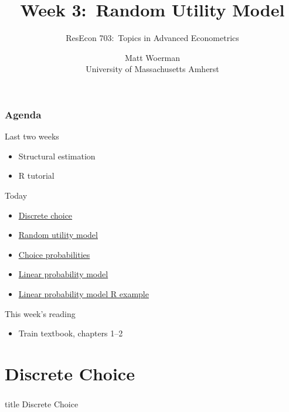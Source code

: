 \documentclass{beamer}\usepackage[]{graphicx}\usepackage[]{color}
\title[Week 3:\ Random Utility Model]{Week 3:\ Random Utility Model}
\author[ResEcon 703:\ Advanced Econometrics]{ResEcon 703:\ Topics in Advanced Econometrics}
\date{Matt Woerman\\University of Massachusetts Amherst}
\begin{document}
{ 
\begin{frame}[noframenumbering]
    \titlepage
\end{frame}
}

\begin{frame}\frametitle{Agenda}
    Last two weeks
    \begin{itemize}
    	\item Structural estimation
        \item R tutorial
    \end{itemize}
    \vspace{2ex}
    Today
    \begin{itemize}
    	\item \hyperlink{page.\getpagerefnumber{dc}}{Discrete choice}
        \item \hyperlink{page.\getpagerefnumber{rum}}{Random utility model}
        \item \hyperlink{page.\getpagerefnumber{probabilities}}{Choice probabilities}
        \item \hyperlink{page.\getpagerefnumber{lpm}}{Linear probability model}
        \item \hyperlink{page.\getpagerefnumber{example}}{Linear probability model R example}
    \end{itemize}
    \vspace{2ex}
    This week's reading
    \begin{itemize}
        \item Train textbook, chapters 1--2
    \end{itemize}
\end{frame}

\section{Discrete Choice}
\label{dc}
\begin{frame}\frametitle{}
    \vfill
    \centering
    \begin{beamercolorbox}[center]{title}
        \Large Discrete Choice
    \end{beamercolorbox}
    \vfill
\end{frame}
\end{document}
